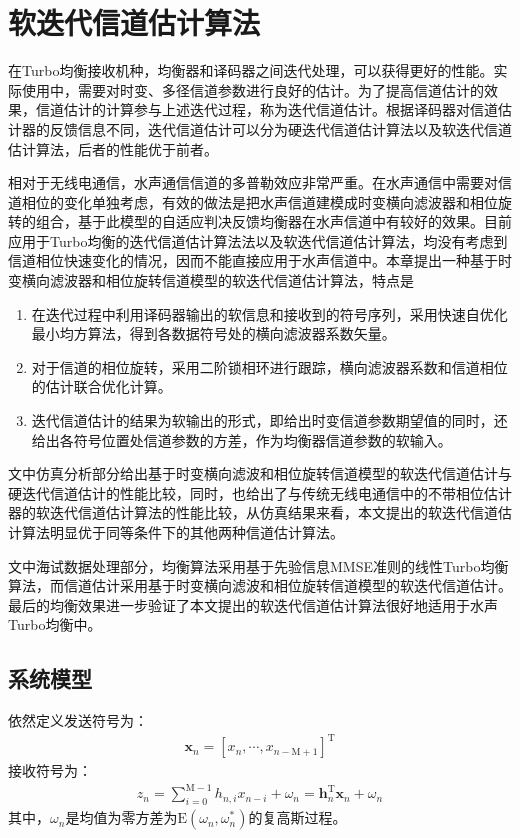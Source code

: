 %
\chapter{软迭代信道估计算法}
\thispagestyle{empty}
在Turbo均衡接收机种，均衡器和译码器之间迭代处理，可以获得更好的性能。实际使用中，需要对时变、多径信道参数进行良好的估计。为了提高信道估计的效果，信道估计的计算参与上述迭代过程，称为迭代信道估计。根据译码器对信道估计器的反馈信息不同，迭代信道估计可以分为硬迭代信道估计算法\citep{Nefedov2003}以及软迭代信道估计算法\citep{Otnes2004,Sandell1998,Qichenhao2011}，后者的性能优于前者。

相对于无线电通信，水声通信信道的多普勒效应非常严重。在水声通信中需要对信道相位的变化单独考虑，有效的做法是把水声信道建模成时变横向滤波器和相位旋转的组合，基于此模型的自适应判决反馈均衡器在水声信道中有较好的效果\citep{Geller1996}。目前应用于Turbo均衡的迭代信道估计算法法\citep{Nefedov2003}以及软迭代信道估计算法\citep{Otnes2004,Sandell1998,Qichenhao2011}，均没有考虑到信道相位快速变化的情况，因而不能直接应用于水声信道中。本章提出一种基于时变横向滤波器和相位旋转信道模型的软迭代信道估计算法，特点是
\begin{enumerate}
    \item 在迭代过程中利用译码器输出的软信息和接收到的符号序列，采用快速自优化最小均方算法，得到各数据符号处的横向滤波器系数矢量。
    \item 对于信道的相位旋转，采用二阶锁相环进行跟踪，横向滤波器系数和信道相位的估计联合优化计算。
    \item 迭代信道估计的结果为软输出的形式，即给出时变信道参数期望值的同时，还给出各符号位置处信道参数的方差，作为均衡器信道参数的软输入。
\end{enumerate}

文中仿真分析部分给出基于时变横向滤波和相位旋转信道模型的软迭代信道估计与硬迭代信道估计的性能比较，同时，也给出了与传统无线电通信中的不带相位估计器的软迭代信道估计算法的性能比较，从仿真结果来看，本文提出的软迭代信道估计算法明显优于同等条件下的其他两种信道估计算法。

文中海试数据处理部分，均衡算法采用基于先验信息MMSE准则的线性Turbo均衡算法，而信道估计采用基于时变横向滤波和相位旋转信道模型的软迭代信道估计。最后的均衡效果进一步验证了本文提出的软迭代信道估计算法很好地适用于水声Turbo均衡中。
\section{系统模型}
依然定义发送符号为：
\begin{eqnarray}
    \mathbf{x}_n=[x_n,\cdots,x_{n-\mathrm{M}+1}]^{\mathrm{T}}
    \label{equ:4.1}
\end{eqnarray}
接收符号为：
\begin{eqnarray}
    z_n=\sum_{i=0}^{\mathrm{M}-1}h_{n,i}x_{n-i}+\omega_n=\mathbf{h}_n^{\mathrm{T}}\mathbf{x}_n+\omega_n
    \label{equ:4.2}
\end{eqnarray}
其中，$\omega_n$是均值为零方差为$\mathrm{E}(\omega_n,\omega_n^*)$的复高斯过程。

